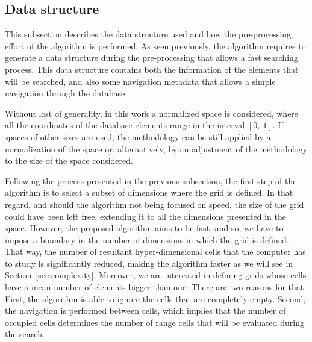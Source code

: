 \documentclass[review]{elsarticle}
\begin{document}
\subsection{Data structure}
\label{sec:structure}

This subsection describes the data structure used and how the pre-processing effort of the algorithm is performed. As seen previously, the algorithm requires to generate a data structure during the pre-processing that allows a fast searching process. This data structure contains both the information of the elements that will be searched, and also some navigation metadata that allows a simple navigation through the database.

Without lost of generality, in this work a normalized space is considered, where all the coordinates of the database elements range in the interval $[0,\: 1]$. If spaces of other sizes are used, the methodology can be still applied by a normalization of the space or, alternatively, by an adjustment of the methodology to the size of the space considered.

Following the process presented in the previous subsection, the first step of the algorithm is to select a subset of dimensions where the grid is defined. In that regard, and should the algorithm not being focused on speed, the size of the grid could have been left free, extending it to all the dimensions presented in the space. However, the proposed algorithm aims to be fast, and so, we have to impose a boundary in the number of dimensions in which the grid is defined. That way, the number of resultant hyper-dimensional cells that the computer has to study is significantly reduced, making the algorithm faster as we will see in Section~\ref{sec:complexity}. Moreover, we are interested in defining grids whose cells have a mean number of elements bigger than one. There are two reasons for that. First, the algorithm is able to ignore the cells that are completely empty. Second, the navigation is performed between cells, which implies that the number of occupied cells determines the number of range cells that will be evaluated during the search.
\end{document}
